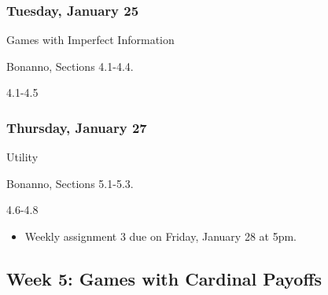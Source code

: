 \documentclass[
]{article}
\providecommand{\tightlist}{%
  \setlength{\itemsep}{0pt}\setlength{\parskip}{0pt}}
\begin{document}
\begin{multicols}{2}

\hypertarget{tuesday-january-25}{%
\subsubsection{Tuesday, January 25}\label{tuesday-january-25}}

\begin{description}
\tightlist
\item[Topic]
Games with Imperfect Information
\item[Reading]
Bonanno, Sections 4.1-4.4.
\item[Video lectures]
4.1-4.5
\end{description}

\hypertarget{thursday-january-27}{%
\subsubsection{Thursday, January 27}\label{thursday-january-27}}

\begin{description}
\tightlist
\item[Topic]
Utility
\item[Reading]
Bonanno, Sections 5.1-5.3.
\item[Video lectures]
4.6-4.8
\end{description}

\end{multicols}

\begin{itemize}
\tightlist
\item
  Weekly assignment 3 due on Friday, January 28 at 5pm.
\end{itemize}

\newpage

\hypertarget{week-5-games-with-cardinal-payoffs}{%
\subsection{Week 5: Games with Cardinal
Payoffs}\label{week-5-games-with-cardinal-payoffs}}
\end{document}
